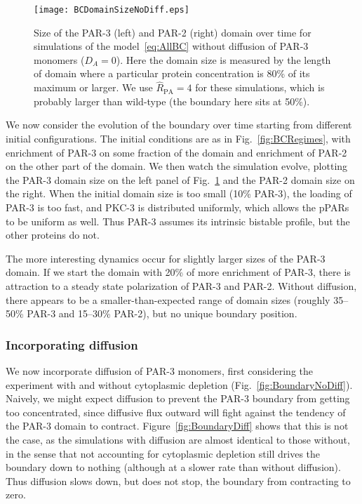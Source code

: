 \documentclass[11pt]{article}
\newcommand{\6}[1]{#1_{\text{6}}}
\newcommand{\3}[1]{#1_{\text{3}}}
\begin{document}
\begin{figure}
\centering
\texttt{[image: BCDomainSizeNoDiff.eps]}
\caption{\label{fig:BCDSNoD} Size of the PAR-3 (left) and PAR-2 (right) domain over time for simulations of the model\ \eqref{eq:AllBC} without diffusion of PAR-3 monomers ($D_A=0$). Here the domain size is measured by the length of domain where a particular protein concentration is 80\% of its maximum or larger. We use $\hat R_\text{PA}=4$ for these simulations, which is probably larger than wild-type (the boundary here sits at 50\%).}
\end{figure}

We now consider the evolution of the boundary over time starting from different initial configurations. The initial conditions are as in Fig.\ \ref{fig:BCRegimes}, with enrichment of PAR-3 on some fraction of the domain and enrichment of PAR-2 on the other part of the domain. We then watch the simulation evolve, plotting the PAR-3 domain size on the left panel of Fig.\ \ref{fig:BCDSNoD} and the PAR-2 domain size on the right. When the initial domain size is too small (10\% PAR-3), the loading of PAR-3 is too fast, and PKC-3 is distributed uniformly, which allows the pPARs to be uniform as well. Thus PAR-3 assumes its intrinsic bistable profile, but the other proteins do not.

The more interesting dynamics occur for slightly larger sizes of the PAR-3 domain. If we start the domain with 20\% of more enrichment of PAR-3, there is attraction to a steady state polarization of PAR-3 and PAR-2. Without diffusion, there appears to be a smaller-than-expected range of domain sizes (roughly 35--50\% PAR-3 and 15--30\% PAR-2), but no unique boundary position.


\subsubsection{Incorporating diffusion}
We now incorporate diffusion of PAR-3 monomers, first considering the experiment with and without cytoplasmic depletion (Fig.\ \ref{fig:BoundaryNoDiff}). Naively, we might expect diffusion to prevent the PAR-3 boundary from getting too concentrated, since diffusive flux outward will fight against the tendency of the PAR-3 domain to contract. Figure\ \ref{fig:BoundaryDiff} shows that this is not the case, as the simulations with diffusion are almost identical to those without, in the sense that not accounting for cytoplasmic depletion still drives the boundary down to nothing (although at a slower rate than without diffusion). Thus diffusion slows down, but does not stop, the boundary from contracting to zero. 
\end{document}
